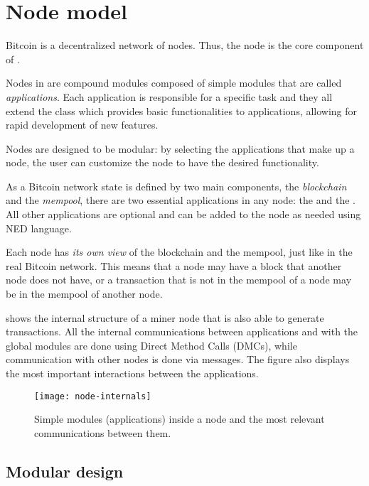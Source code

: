 \section{Node model}\label{sec:impl-node}

Bitcoin is a decentralized network of nodes. Thus, the node is the core
component of \iblock{}.

Nodes in \iblock{} are compound modules composed of simple modules that are
called \emph{applications}. Each application is responsible for a specific task
and they all extend the  class which provides basic
functionalities to applications, allowing for rapid development of new
features.

Nodes are designed to be modular: by selecting the applications that make up a
node, the user can customize the node to have the desired functionality.

As a Bitcoin network state is defined by two main components, the
\emph{blockchain} and the \emph{mempool}, there are two essential applications
in any \iblock{} node: the  and the
. All other applications are optional and can be added to
the node as needed using NED language.

Each \iblock{} node has \emph{its own view} of the blockchain and the mempool,
just like in the real Bitcoin network. This means that a node may have a block
that another node does not have, or a transaction that is not in the mempool of
a node may be in the mempool of another node.

 shows the internal structure of a miner node that
is also able to generate transactions. All the internal communications between
applications and with the global modules are done using Direct Method Calls
(DMCs), while communication with other nodes is done via messages. The figure
also displays the most important interactions between the applications.

\begin{figure}[tbhp]
	\centering
	\texttt{[image: node-internals]}
	\caption{Simple modules (applications) inside a node and the most
	relevant communications between them.}\label{fig:node-internals}
\end{figure}

\subsection{Modular design}\label{subsec:modular-design}


